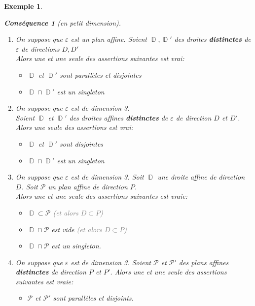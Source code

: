 \documentclass[a4paper, oneside]{report}
\theoremstyle{break}
\newtheorem{consequence}[thm]{Conséquence}
\newtheorem{exemple}[thm]{Exemple}
\newcommand{\gray}[1]{\textcolor{gray}{#1}}
\DeclareMathOperator{\D}{\mathbb{D}}
\renewcommand{\P}{\mathcal{P}}
\newcommand{\slign}{\textbf}
\newcommand{\ensP}{\P}
\newcommand{\ensD}{\D}
\begin{document}
\begin{exemple}
\begin{consequence}[en petit dimension]
\begin{enumerate}
\item On suppose que $\varepsilon$ est un plan affine. Soient $\ensD, \ensD'$ des droites \slign{distinctes} de $\varepsilon$ de directions $D, D'$\\
Alors une et une seule des assertions suivantes est vrai:
\begin{itemize}[label=$\bullet$]
\item $\ensD$ et $\ensD'$ sont parallèles et disjointes

\item $\ensD \cap \ensD'$ est un singleton
\end{itemize}

\medbreak

\item On suppose que $\varepsilon$ est de dimension 3.\\
Soient $\ensD$ et $\ensD'$ des droites affines \slign{distinctes} de $\varepsilon$ de direction $D$ et $D'$.\\
Alors une seule des assertions est vrai:
\begin{itemize}[label=$\bullet$]
\item $\ensD$ et $\ensD'$ sont disjointes

\item $\ensD \cap \ensD'$ est un singleton
\end{itemize}

\medbreak

\item On suppose que $\varepsilon$ est de dimension 3. Soit $\ensD$ une droite affine de direction $D$. Soit $\ensP$ un plan affine de direction $P$.\\
Alors une et une seule des assertions suivantes est vraie:
\begin{itemize}[label=$\bullet$]
\item $\ensD \subset \ensP$	\quad	\gray{(et alors $D \subset P$)}

\item $\ensD \cap \ensP$ est vide 	\quad	\gray{(et alors $D \subset P$)}

\item $\ensD \cap \ensP$ est un singleton.
\end{itemize}

\medbreak

\item On suppose que $\varepsilon$ est de dimension 3. Soient $\ensP$ et $\ensP'$ des plans affines \slign{distinctes} de direction $P$ et $P'$. Alors une et une seule des assertions suivantes est vraie:
\begin{itemize}[label=$\bullet$]
\item $\ensP$ et $\ensP'$ sont parallèles et disjoints.


\end{itemize}
\end{enumerate}
\end{consequence}
\end{exemple}
\end{document}
